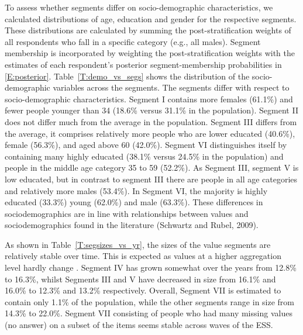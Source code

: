 \documentclass[12pt,letter]{article}\usepackage[]{graphicx}\usepackage[]{xcolor}
\begin{document}
To assess whether segments differ on socio-demographic characteristics, we calculated distributions of age, education and gender for the respective segments. These distributions are calculated by summing the post-stratification weights of all respondents who fall in a specific category (e.g., all males). Segment membership is incorporated by weighting the post-stratification weights with the estimates of each respondent's posterior segment-membership probabilities in \eqref{E:posterior}. Table~\ref{T:demo_vs_segs} shows the distribution of the socio-demographic variables across the segments. The segments differ with respect to socio-demographic characteristics. Segment I contains more females (61.1\%) and fewer people younger than 34 (18.6\% versus 31.1\% in the population). Segment II does not differ much from the average in the population. Segment III differs from the average, it comprises relatively more people who are lower educated (40.6\%), female (56.3\%), and aged above 60 (42.0\%). Segment VI distinguishes itself by containing many highly educated (38.1\% versus 24.5\% in the population) and people in the middle age category 35 to 59 (52.2\%). As Segment III, segment V is low educated, but in contrast to segment III there are people in all age categories and relatively more males (53.4\%). In Segment VI, the majority is highly educated (33.3\%) young (62.0\%) and  male (63.3\%). These differences in sociodemographics are in line with relationships between values and sociodemographics found in the literature (Schwartz and Rubel, 2009).

As shown in Table~\ref{T:segsizes_vs_yr}, the sizes of the value segments are relatively stable over time. This is expected as values at a higher aggregation level hardly change \citep{schwartz2006}. Segment IV has grown somewhat over the years from 12.8\% to 16.3\%, whilst Segments III and V have decreased in size from 16.1\% and 16.0\% to 12.3\% and 13.2\% respectively. Overall, Segment VII is estimated to contain only 1.1\% of the population, while the other segments range in size from 14.3\% to 22.0\%. Segment VII consisting of people who had many missing values (no answer) on a subset of the items seems stable across waves of the ESS.


 
\end{document}

